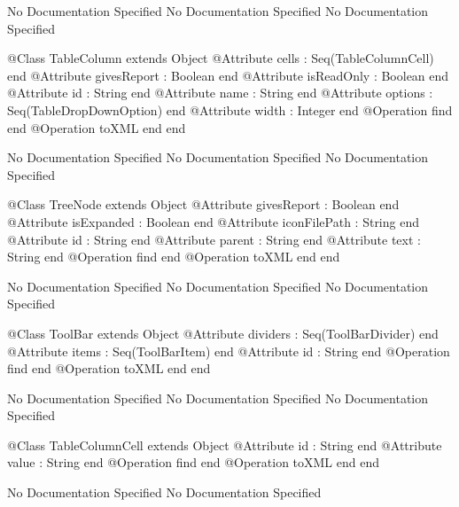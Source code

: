 No Documentation Specified
No Documentation Specified
No Documentation Specified
\begin{Interface}
@Class TableColumn extends Object
  @Attribute cells : Seq(TableColumnCell) end
  @Attribute givesReport : Boolean end
  @Attribute isReadOnly : Boolean end
  @Attribute id : String end
  @Attribute name : String end
  @Attribute options : Seq(TableDropDownOption) end
  @Attribute width : Integer end
  @Operation find end
  @Operation toXML end
end
\end{Interface}
No Documentation Specified
No Documentation Specified
No Documentation Specified
\begin{Interface}
@Class TreeNode extends Object
  @Attribute givesReport : Boolean end
  @Attribute isExpanded : Boolean end
  @Attribute iconFilePath : String end
  @Attribute id : String end
  @Attribute parent : String end
  @Attribute text : String end
  @Operation find end
  @Operation toXML end
end
\end{Interface}
No Documentation Specified
No Documentation Specified
No Documentation Specified
\begin{Interface}
@Class ToolBar extends Object
  @Attribute dividers : Seq(ToolBarDivider) end
  @Attribute items : Seq(ToolBarItem) end
  @Attribute id : String end
  @Operation find end
  @Operation toXML end
end
\end{Interface}
No Documentation Specified
No Documentation Specified
No Documentation Specified
\begin{Interface}
@Class TableColumnCell extends Object
  @Attribute id : String end
  @Attribute value : String end
  @Operation find end
  @Operation toXML end
end
\end{Interface}
No Documentation Specified
No Documentation Specified
